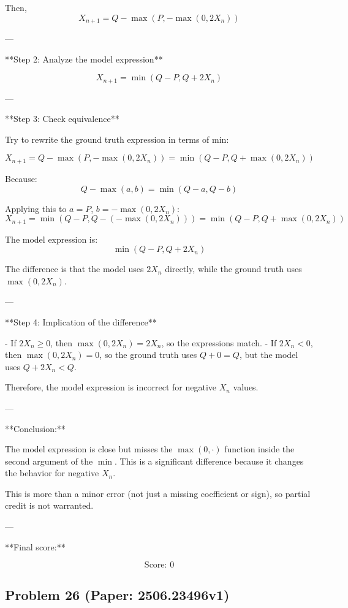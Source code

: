 \documentclass[10pt]{article}
\begin{document}
Then,
\[
X_{n+1} = Q - \max(P, -\max(0, 2X_n))
\]

---

**Step 2: Analyze the model expression**

\[
X_{n+1} = \min(Q - P, Q + 2X_n)
\]

---

**Step 3: Check equivalence**

Try to rewrite the ground truth expression in terms of min:

\[
X_{n+1} = Q - \max(P, -\max(0, 2X_n)) = \min(Q - P, Q + \max(0, 2X_n))
\]

Because:
\[
Q - \max(a,b) = \min(Q - a, Q - b)
\]

Applying this to \(a = P\), \(b = -\max(0, 2X_n)\):
\[
X_{n+1} = \min(Q - P, Q - (-\max(0, 2X_n))) = \min(Q - P, Q + \max(0, 2X_n))
\]

The model expression is:
\[
\min(Q - P, Q + 2X_n)
\]

The difference is that the model uses \(2X_n\) directly, while the ground truth uses \(\max(0, 2X_n)\).

---

**Step 4: Implication of the difference**

- If \(2X_n \geq 0\), then \(\max(0, 2X_n) = 2X_n\), so the expressions match.
- If \(2X_n < 0\), then \(\max(0, 2X_n) = 0\), so the ground truth uses \(Q + 0 = Q\), but the model uses \(Q + 2X_n < Q\).

Therefore, the model expression is incorrect for negative \(X_n\) values.

---

**Conclusion:**

The model expression is close but misses the \(\max(0, \cdot)\) function inside the second argument of the \(\min\). This is a significant difference because it changes the behavior for negative \(X_n\).

This is more than a minor error (not just a missing coefficient or sign), so partial credit is not warranted.

---

**Final score:**

\[
\boxed{
\text{Score: } 0
}
\]

\newpage
\subsection*{Problem 26 (Paper: 2506.23496v1)}
\end{document}
